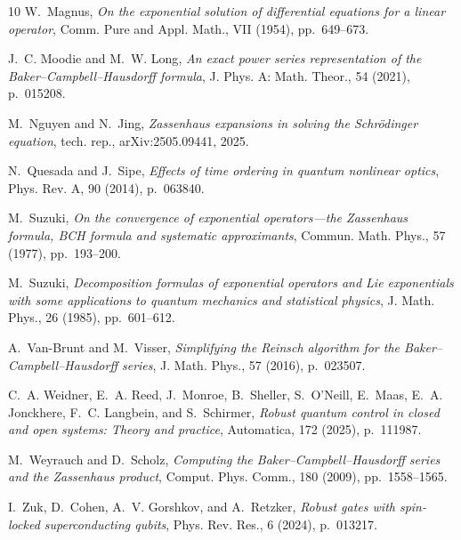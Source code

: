 \documentclass[11pt]{article}
\begin{document}
\begin{thebibliography}{10}
{\sc W.~Magnus}, {\em On the exponential solution of differential equations for
  a linear operator}, Comm. Pure and Appl. Math., {VII} (1954), pp.~649--673.

{\sc J.~C. Moodie and M.~W. Long}, {\em An exact power series representation of
  the {B}aker--{C}ampbell--{H}ausdorff formula}, J. Phys. A: Math. Theor., 54
  (2021), p.~015208.
  
{\sc M.~Nguyen and N.~Jing}, {\em Zassenhaus expansions in solving the {S}chr\"{o}dinger equation}, 
tech. rep., arXiv:2505.09441, 2025.


{\sc N.~Quesada and J.~Sipe}, {\em Effects of time ordering in quantum
  nonlinear optics}, Phys. Rev. A, 90 (2014), p.~063840.

{\sc M.~Suzuki}, {\em On the convergence of exponential operators---the
  {Z}assenhaus formula, {BCH} formula and systematic approximants}, Commun.
  Math. Phys., 57 (1977), pp.~193--200.

{\sc M.~Suzuki},  {\em Decomposition
  formulas of exponential operators and {L}ie exponentials with some
  applications to quantum mechanics and statistical physics}, J. Math. Phys.,
  26 (1985), pp.~601--612.

{\sc A.~Van-Brunt and M.~Visser}, {\em Simplifying the {R}einsch algorithm for
  the {B}aker--{C}ampbell--{H}ausdorff series}, J. Math. Phys., 57 (2016),
  p.~023507.

{\sc C.~A. Weidner, E.~A. Reed, J.~Monroe, B.~Sheller, S.~O'Neill, E.~Maas,
  E.~A. Jonckhere, F.~C. Langbein, and S.~Schirmer}, {\em Robust quantum
  control in closed and open systems: {T}heory and practice}, Automatica, 172
  (2025), p.~111987.

{\sc M.~Weyrauch and D.~Scholz}, {\em Computing the
  {B}aker--{C}ampbell--{H}ausdorff series and the {Z}assenhaus product},
  Comput. Phys. Comm., 180 (2009), pp.~1558--1565.

{\sc I.~Zuk, D.~Cohen, A.~V. Gorshkov, and A.~Retzker}, {\em Robust gates with
  spin-locked superconducting qubits}, Phys. Rev. Res., 6 (2024), p.~013217.

\end{thebibliography}
\end{document}
